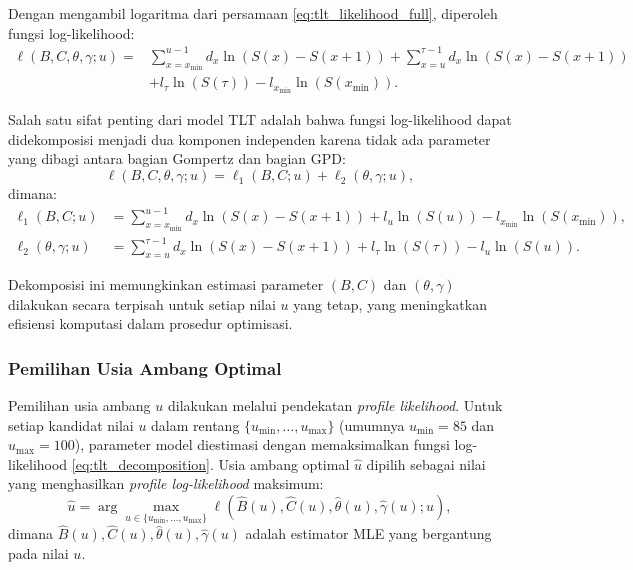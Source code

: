 Dengan mengambil logaritma dari persamaan \eqref{eq:tlt_likelihood_full}, diperoleh fungsi log-likelihood:
\begin{equation}
\begin{split}
\ell(B, C, \theta, \gamma; u) = &\sum_{x=x_{\text{min}}}^{u-1} d_x \ln(S(x) - S(x+1)) + \sum_{x=u}^{\tau-1} d_x \ln(S(x) - S(x+1)) \\
&+ l_\tau \ln(S(\tau)) - l_{x_{\text{min}}} \ln(S(x_{\text{min}})).
\end{split}
\label{eq:tlt_loglik_expanded}
\end{equation}

Salah satu sifat penting dari model TLT adalah bahwa fungsi log-likelihood dapat didekomposisi menjadi dua komponen independen karena tidak ada parameter yang dibagi antara bagian Gompertz dan bagian GPD:
\begin{equation}
\ell(B, C, \theta, \gamma; u) = \ell_1(B, C; u) + \ell_2(\theta, \gamma; u),
\label{eq:tlt_decomposition}
\end{equation}
dimana:
\begin{align}
\ell_1(B, C; u) &= \sum_{x=x_{\text{min}}}^{u-1} d_x \ln(S(x) - S(x+1)) + l_u \ln(S(u)) - l_{x_{\text{min}}} \ln(S(x_{\text{min}})), \label{eq:tlt_gompertz_loglik} \\
\ell_2(\theta, \gamma; u) &= \sum_{x=u}^{\tau-1} d_x \ln(S(x) - S(x+1)) + l_\tau \ln(S(\tau)) - l_u \ln(S(u)). \label{eq:tlt_gpd_loglik}
\end{align}

Dekomposisi ini memungkinkan estimasi parameter $(B, C)$ dan $(\theta, \gamma)$ dilakukan secara terpisah untuk setiap nilai $u$ yang tetap, yang meningkatkan efisiensi komputasi dalam prosedur optimisasi.

\subsubsection{Pemilihan Usia Ambang Optimal}

Pemilihan usia ambang $u$ dilakukan melalui pendekatan \textit{profile likelihood}. Untuk setiap kandidat nilai $u$ dalam rentang $\{u_{\min}, \ldots, u_{\max}\}$ (umumnya $u_{\min} = 85$ dan $u_{\max} = 100$), parameter model diestimasi dengan memaksimalkan fungsi log-likelihood \eqref{eq:tlt_decomposition}. Usia ambang optimal $\hat{u}$ dipilih sebagai nilai yang menghasilkan \textit{profile log-likelihood} maksimum:
\begin{equation}
\hat{u} = \arg\max_{u \in \{u_{\min}, \ldots, u_{\max}\}} \ell(\hat{B}(u), \hat{C}(u), \hat{\theta}(u), \hat{\gamma}(u); u),
\label{eq:profile_likelihood_optimal}
\end{equation}
dimana $\hat{B}(u), \hat{C}(u), \hat{\theta}(u), \hat{\gamma}(u)$ adalah estimator MLE yang bergantung pada nilai $u$.

